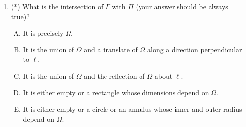 \documentclass[10pt]{amsart}
\begin{document}
\begin{enumerate}
  \begin{enumerate}[(A)]
  \item $(1/6) \pi b^{3/2}h^{3/2}$
  \item $(1/3) \pi b^2h$
  \item $(1/3) \pi bh^2$
  \item $(2/3) \pi b^2h$
  \item $(2/3) \pi bh^2$
  \end{enumerate}

  {\em Answer}: Option (C).

  {\em Explanation}: The region is a union or difference of two right
  circular cones, as seen in some earlier multiple choice
  questions. Both these cones have {\em radius} $h$. The sum or
  difference of the heights of these cones is $b$. Thus, the formula
  gives (C).

  For the next two questions, suppose $\Omega$ is a region in a plane
  $\Pi$ and $\ell$ is a line on $\Pi$ such that $\Omega$ lies
  completely on one side of $\ell$ (in particular, it does not
  intersect $\ell$). Let $\Gamma$ be the solid of revolution obtained
  by revolving $\Omega$ about $\ell$. Suppose further that the
  intersection of $\Omega$ with any line perpendicular to $\ell$ is
  either empty or a point or a line segment.

  {\em Performance review}: $4$ out of $11$ got this. $3$ chose (C),
  $3$ chose (E), $1$ left the question blank.

  {\em Historical note}: $10$ out of $16$ people got
  this correct. $2$ people each chose (B) and (D) and $1$ person each
  chose (A) and (E).
\item (*) What is the intersection of $\Gamma$ with $\Pi$ (your answer
  should be always true)?

  \begin{enumerate}[(A)]
  \item It is precisely $\Omega$.
  \item It is the union of $\Omega$ and a translate of $\Omega$ along
    a direction perpendicular to $\ell$.
  \item It is the union of $\Omega$ and the reflection of $\Omega$
    about $\ell$.
  \item It is either empty or a rectangle whose dimensions depend on
    $\Omega$.
  \item It is either empty or a circle or an annulus whose inner and
    outer radius depend on $\Omega$.
  \end{enumerate}


\end{enumerate}
\end{document}

